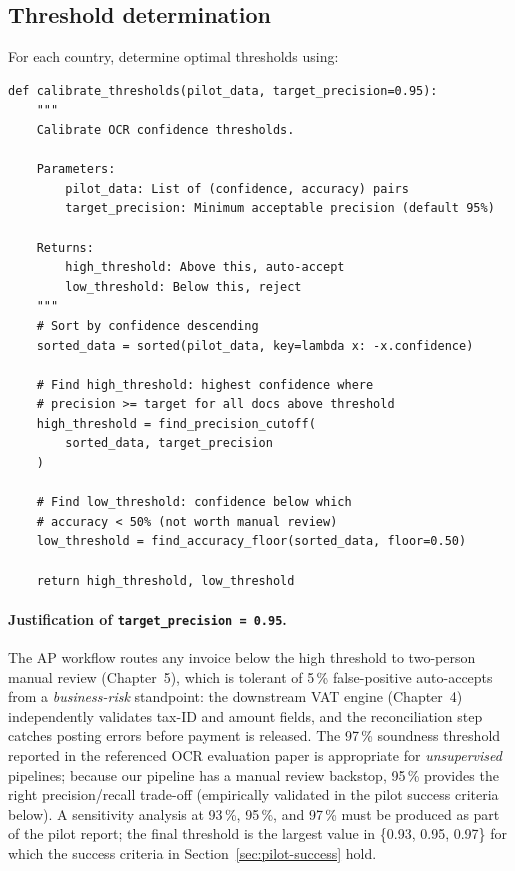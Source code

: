 \documentclass[11pt,a4paper,twoside]{report}
\begin{document}
\subsection{Threshold determination}

For each country, determine optimal thresholds using:

\begin{lstlisting}[basicstyle=\ttfamily\small,caption={Threshold calibration algorithm.}]
def calibrate_thresholds(pilot_data, target_precision=0.95):
    """
    Calibrate OCR confidence thresholds.

    Parameters:
        pilot_data: List of (confidence, accuracy) pairs
        target_precision: Minimum acceptable precision (default 95%)

    Returns:
        high_threshold: Above this, auto-accept
        low_threshold: Below this, reject
    """
    # Sort by confidence descending
    sorted_data = sorted(pilot_data, key=lambda x: -x.confidence)

    # Find high_threshold: highest confidence where
    # precision >= target for all docs above threshold
    high_threshold = find_precision_cutoff(
        sorted_data, target_precision
    )

    # Find low_threshold: confidence below which
    # accuracy < 50% (not worth manual review)
    low_threshold = find_accuracy_floor(sorted_data, floor=0.50)

    return high_threshold, low_threshold
\end{lstlisting}

\paragraph{Justification of \texttt{target\_precision = 0.95}.}
The AP workflow routes any invoice below the high threshold to
two-person manual review (Chapter~5), which is tolerant of 5\,\%
false-positive auto-accepts from a \emph{business-risk} standpoint:
the downstream VAT engine (Chapter~4) independently validates
tax-ID and amount fields, and the reconciliation step catches
posting errors before payment is released. The 97\,\% soundness
threshold reported in the referenced OCR evaluation paper is
appropriate for \emph{unsupervised} pipelines; because our pipeline
has a manual review backstop, 95\,\% provides the right
precision/recall trade-off (empirically validated in the pilot
success criteria below). A sensitivity analysis at 93\,\%, 95\,\%,
and 97\,\% must be produced as part of the pilot report; the final
threshold is the largest value in \{0.93, 0.95, 0.97\} for which
the success criteria in Section~\ref{sec:pilot-success} hold.
\end{document}

